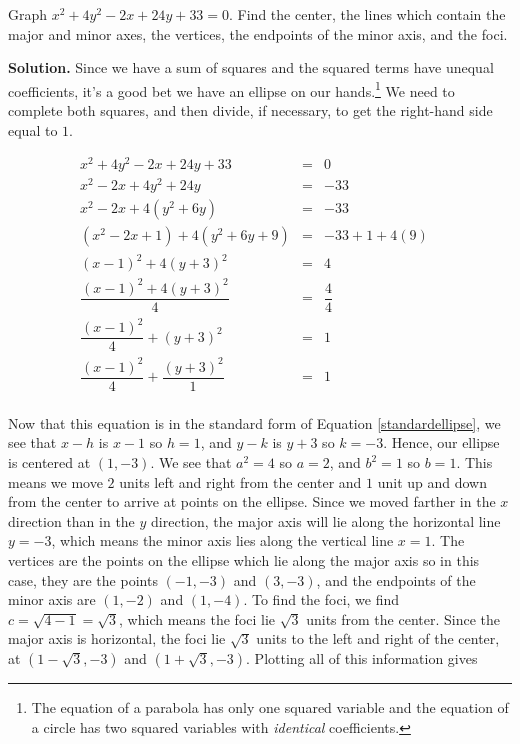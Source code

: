 \begin{ex} \label{ctsellipseex} Graph $x^2+4y^2-2x+24y+33 = 0$. Find the center, the lines which contain the major and minor axes, the vertices, the endpoints of the minor axis, and the foci.

\medskip

{\bf Solution.}  Since we have a sum of squares and the squared terms have unequal coefficients, it's a good bet we have an ellipse on our hands.\footnote{The equation of a parabola has only one squared variable and the equation of a circle has two squared variables with \textit{identical} coefficients.}  We need to complete both squares, and then divide, if necessary, to get the right-hand side equal to $1$.

\[ \begin{array}{rclr} x^2+4y^2-2x+24y+33 & = & 0 & \\ x^2-2x+4y^2+24y & = & -33 & \\   x^2 - 2x + 4\left(y^2+6y\right)  &  = & - 33 &  \\   \left(x^2 - 2x +1\right) + 4\left(y^2+6y+9\right)  &  = & - 33 + 1 + 4(9)& \\ (x-1)^2 + 4(y+3)^2  &  = & 4 & \\[5pt]  \dfrac{(x-1)^2 + 4(y+3)^2}{4}  &  = & \dfrac{4}{4} & \\[10pt] \dfrac{(x-1)^2}{4} + (y+3)^2 & = & 1 & \\[10pt] \dfrac{(x-1)^2}{4} + \dfrac{(y+3)^2}{1} & = & 1 & \\  \end{array} \]

\medskip

Now that this equation is in the standard form of Equation \ref{standardellipse}, we see that $x-h$ is $x-1$ so $h = 1$, and $y-k$ is $y+3$ so $k = -3$.  Hence, our ellipse is centered at $(1,-3)$.  We see that $a^2 = 4$ so $a=2$, and $b^2 = 1$ so $b=1$.  This means we move $2$ units left and right from the center and $1$ unit up and down from the center to arrive at points on the ellipse.  Since we moved farther in the $x$ direction than in the $y$ direction, the major axis will lie along the horizontal line $y=-3$, which means the minor axis lies along the vertical line $x = 1$. The vertices are the points on the ellipse which lie along the major axis so in this case, they are the points $(-1,-3)$ and $(3,-3)$, and the endpoints of the minor axis are $(1,-2)$ and $(1,-4)$. To find the foci, we find $c = \sqrt{4-1} = \sqrt{3}$, which means the foci lie $\sqrt{3}$ units from the center. Since the major axis is horizontal, the foci lie $\sqrt{3}$ units to the left and right of the center, at $(1-\sqrt{3},-3)$ and $(1+\sqrt{3},-3)$.  Plotting all of this information gives


\end{ex}
